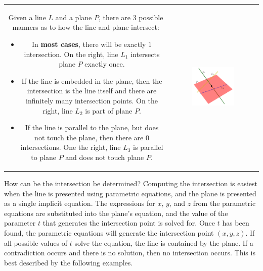 \documentclass{article}
\begin{document}
\begin{tabular}{cc}
\parbox{0.5\textwidth}{
Given a line \(L\) and a plane \(P\), there are \(3\) possible manners as to how the line and plane intersect:
\begin{itemize}
\item In {\bf most cases}, there will be exactly \(1\) intersection. On the right, line \(L_1\) intersects plane \(P\) exactly once. 
\item If the line is embedded in the plane, then the intersection is the line itself and there are infinitely many intersection points. On the right, line \(L_2\) is part of plane \(P\). 
\item If the line is parallel to the plane, but does not touch the plane, then there are 0 intersections. One the right, line \(L_3\) is parallel to plane \(P\) and does not touch plane \(P\).
\end{itemize} 
} & \parbox{0.5\textwidth}{
\includegraphics[width = 0.5\textwidth]{line_plane_intersections}
}
\end{tabular}

How can be the intersection be determined? Computing the intersection is easiest when the line is presented using parametric equations, and the plane is presented as a single implicit equation. The expressions for \(x\), \(y\), and \(z\) from the parametric equations are substituted into the plane's equation, and the value of the parameter \(t\) that generates the intersection point is solved for. Once \(t\) has been found, the parametric equations will generate the intersection point \((x, y, z)\). If all possible values of \(t\) solve the equation, the line is contained by the plane. If a contradiction occurs and there is no solution, then no intersection occurs. This is best described by the following examples.
\end{document}

